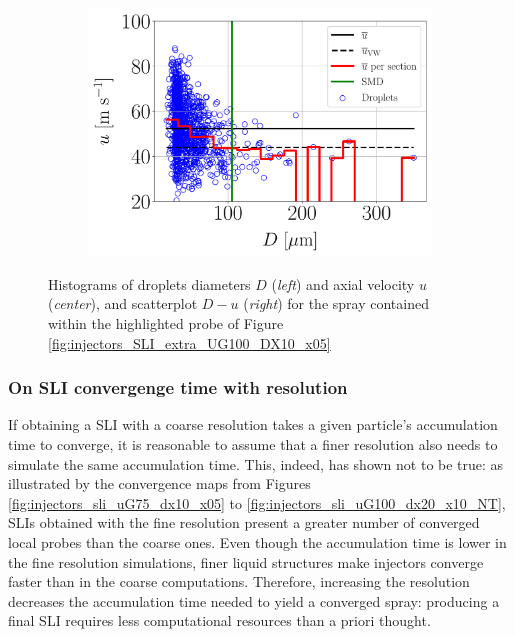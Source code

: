 \begin{figure}[h!]
\begin{subfigure}[b]{0.3\textwidth}
	\centering
   \includegraphics[scale=0.24]{./part2_developments/figures_ch5_resolved_JICF/injectors_SLI_extra/uG100_dx10_x05_vel_scatter}
\end{subfigure}

\caption[Histograms of droplets diameters $D$ (\textsl{left}) and axial velocity $u$ (\textsl{center}), and scatterplot $D - u$ (\textsl{right})]{Histograms of droplets diameters $D$ (\textsl{left}) and axial velocity $u$ (\textsl{center}), and scatterplot $D - u$ (\textsl{right}) for the spray contained within the highlighted probe of Figure \ref{fig:injectors_SLI_extra_UG100_DX10_x05}}
\label{fig:injectors_extra_velocities_interesting}
\end{figure}


\subsubsection*{On SLI convergenge time with resolution}



If obtaining a SLI with a coarse resolution takes a given particle's accumulation time to converge, it is reasonable to assume that a finer resolution also needs to simulate the same accumulation time. This, indeed, has shown not to be true: as illustrated by the convergence maps from Figures \ref{fig:injectors_sli_uG75_dx10_x05} to \ref{fig:injectors_sli_uG100_dx20_x10_NT}, SLIs obtained with the fine resolution present a greater number of converged local probes than the coarse ones. Even though the accumulation time is lower in the fine resolution simulations, finer liquid structures make injectors converge faster than in the coarse computations. Therefore, increasing the resolution decreases the accumulation time needed to yield a converged spray: producing a final SLI requires less computational resources than a priori thought. 

